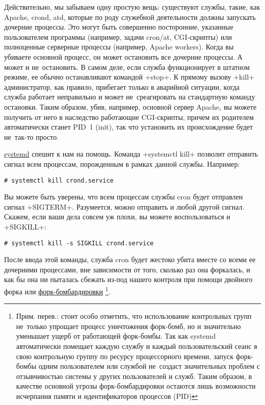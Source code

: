\documentclass[10pt,oneside,a4paper]{article}
\begin{document}
Действительно, мы забываем одну простую вещь: существуют службы, такие, как
Apache, crond, atd, которые по роду служебной деятельности должны запускать
дочерние процессы. Это могут быть совершенно посторонние, указанные
пользователем программы (например, задачи cron/at, CGI-скрипты) или полноценные
серверные процессы (например, Apache workers). Когда вы убиваете основной
процесс, он может остановить все дочерние процессы. А может и не~остановить. В
самом деле, если служба функционирует в штатном режиме, ее обычно останавливают
командой +stop+. К прямому вызову +kill+ администратор, как правило,
прибегает только в аварийной ситуации, когда служба работает неправильно и
может не~среагировать на стандартную команду остановки. Таким образом, убив,
например, основной сервер Apache, вы можете получить от него в наследство
работающие CGI-скрипты, причем их родителем автоматически станет PID~1 (init),
так что установить их происхождение будет не~так-то просто. 

\href{http://www.freedesktop.org/wiki/Software/systemd}{systemd} спешит к нам
на помощь. Команда +systemctl kill+ позволит отправить сигнал всем
процессам, порожденным в рамках данной службы. Например: 

\begin{Verbatim}
# systemctl kill crond.service
\end{Verbatim}

Вы можете быть уверены, что всем процессам службы cron будет отправлен сигнал
+SIGTERM+. Разумеется, можно отправить и любой другой сигнал. Скажем, если ваши
дела совсем уж плохи, вы можете воспользоваться и +SIGKILL+: 

\begin{Verbatim}
# systemctl kill -s SIGKILL crond.service
\end{Verbatim}

После ввода этой команды, служба cron будет жестоко убита вместе со всеми ее
дочерними процессами, вне зависимости от того, сколько раз она форкалась, и
как бы она ни пыталась сбежать из-под нашего контроля при помощи двойного
форка или
\href{http://ru.wikipedia.org/wiki/Fork-%D0%B1%D0%BE%D0%BC%D0%B1%D0%B0}{форк-бомбардировки}%
\footnote{Прим. перев.: стоит особо отметить, что использование контрольных
групп не~только упрощает процесс уничтожения форк-бомб, но и значительно
уменьшает ущерб от работающей форк-бомбы. Так как systemd автоматически
помещает каждую службу и каждый пользовательский сеанс в свою контрольную
группу по ресурсу процессорного времени, запуск форк-бомбы одним
пользователем или службой не~создаст значительных проблем с отзывчивостью
системы у других пользователей и служб. Таким образом, в качестве основной
угрозы форк-бомбардировки остаются лишь возможности исчерпания памяти и
идентификаторов процессов (PID)}.
\end{document}
